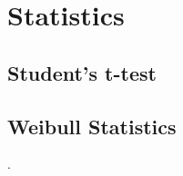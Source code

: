 

\chapter{Statistics}

\section{Student's t-test}
\section{Weibull Statistics}
\label{app:weibull}.
